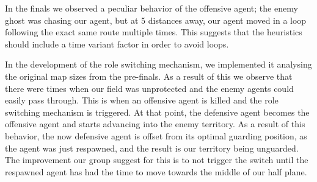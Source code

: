 \documentclass[a4paper,12pt]{article}
\begin{document}
In the finals we observed a peculiar behavior of the offensive agent; the enemy ghost was chasing our agent, but at 5 distances away, our agent moved in a loop following the exact same route multiple times. This suggests that the heuristics should include a time variant factor in order to avoid loops.

In the development of the role switching mechanism, we implemented it analysing the original map sizes from the pre-finals. 
As a result of this we observe that there were times when our field was unprotected and the enemy agents could easily pass through. 
This is when an offensive agent is killed and the role switching mechanism is triggered. At that point, the defensive agent becomes the offensive agent and starts advancing into the enemy territory. As a result of this behavior, the now defensive agent is offset from its optimal guarding position, as the agent was just respawned, and the result is our territory being unguarded. The improvement our group suggest for this is to not trigger the switch until the respawned agent has had the time to move towards the middle of our half plane.








\printbibliography









\end{document}
